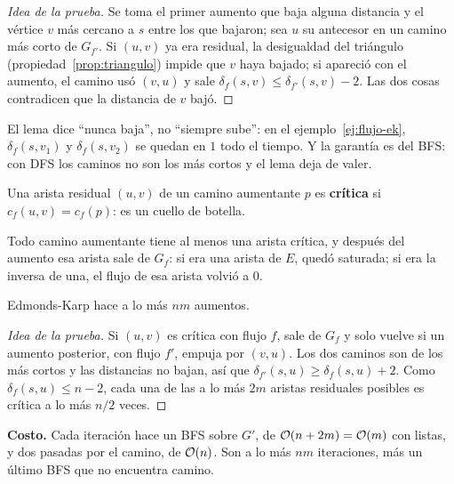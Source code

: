 \documentclass[11pt,letterpaper]{article}
\begin{document}
\begin{proof}[Idea de la prueba]
  Se toma el primer aumento que baja alguna distancia y el vértice $v$
  más cercano a $s$ entre los que bajaron; sea $u$ su antecesor en un
  camino más corto de $G_{f'}$. Si $(u, v)$ ya era residual, la
  desigualdad del triángulo (propiedad~\ref{prop:triangulo}) impide que
  $v$ haya bajado; si apareció con el aumento, el camino usó $(v, u)$
  y sale $\delta_f(s, v) \le \delta_{f'}(s, v) - 2$. Las dos cosas
  contradicen que la distancia de $v$ bajó.
\end{proof}

\begin{ojo}
  El lema dice ``nunca baja'', no ``siempre sube'': en el
  ejemplo~\ref{ej:flujo-ek}, $\delta_f(s, v_1)$ y $\delta_f(s, v_2)$
  se quedan en $1$ todo el tiempo. Y la garantía es del BFS: con DFS
  los caminos no son los más cortos y el lema deja de valer.
\end{ojo}

\begin{definicion}
  Una arista residual $(u, v)$ de un camino aumentante $p$ es
  \textbf{crítica} si $c_f(u, v) = c_f(p)$: es un cuello de botella.
\end{definicion}

Todo camino aumentante tiene al menos una arista crítica, y después
del aumento esa arista sale de $G_f$: si era una arista de $E$, quedó
saturada; si era la inversa de una, el flujo de esa arista volvió a
$0$.

\begin{teorema}\label{teo:flujo-ek-aumentos}
  Edmonds-Karp hace a lo más $n m$ aumentos.
\end{teorema}

\begin{proof}[Idea de la prueba]
  Si $(u, v)$ es crítica con flujo $f$, sale de $G_f$ y solo vuelve si
  un aumento posterior, con flujo $f'$, empuja por $(v, u)$. Los dos
  caminos son de los más cortos y las distancias no bajan, así que
  $\delta_{f'}(s, u) \ge \delta_f(s, u) + 2$. Como
  $\delta_f(s, u) \le n - 2$, cada una de las a lo más $2m$ aristas
  residuales posibles es crítica a lo más $n/2$ veces.
\end{proof}

\textbf{Costo.} Cada iteración hace un BFS sobre $G'$, de
$\mathcal{O}\!\left(n + 2m\right) = \mathcal{O}\!\left(m\right)$ con listas, y dos pasadas por el camino, de
$\mathcal{O}\!\left(n\right)$. Son a lo más $nm$ iteraciones, más un último BFS que no
encuentra camino.
\end{document}
